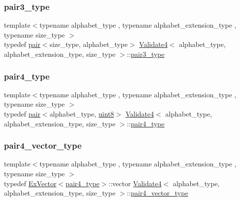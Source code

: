 \subsubsection{\texorpdfstring{pair3\+\_\+type}{pair3\_type}}
{\footnotesize\ttfamily template$<$typename alphabet\+\_\+type , typename alphabet\+\_\+extension\+\_\+type , typename size\+\_\+type $>$ \\
typedef \hyperlink{structpair}{pair}$<$size\+\_\+type, alphabet\+\_\+type$>$ \hyperlink{class_validate4}{Validate4}$<$ alphabet\+\_\+type, alphabet\+\_\+extension\+\_\+type, size\+\_\+type $>$\+::\hyperlink{class_validate4_ac023757abc671597cf81dcc2d70b1ab1}{pair3\+\_\+type}\hspace{0.3cm}{\ttfamily [private]}}

\mbox{\label{class_validate4_a8ef701022ecc2f0ffc1eae0e71e0aaf7}} 
\subsubsection{\texorpdfstring{pair4\+\_\+type}{pair4\_type}}
{\footnotesize\ttfamily template$<$typename alphabet\+\_\+type , typename alphabet\+\_\+extension\+\_\+type , typename size\+\_\+type $>$ \\
typedef \hyperlink{structpair}{pair}$<$alphabet\+\_\+type, \hyperlink{types_8h_a115946cb5fc5879545e9ccea096a6031}{uint8}$>$ \hyperlink{class_validate4}{Validate4}$<$ alphabet\+\_\+type, alphabet\+\_\+extension\+\_\+type, size\+\_\+type $>$\+::\hyperlink{class_validate4_a8ef701022ecc2f0ffc1eae0e71e0aaf7}{pair4\+\_\+type}\hspace{0.3cm}{\ttfamily [private]}}

\mbox{\label{class_validate4_a883822e6f1be0d67f71e1feb9729b1dc}} 
\subsubsection{\texorpdfstring{pair4\+\_\+vector\+\_\+type}{pair4\_vector\_type}}
{\footnotesize\ttfamily template$<$typename alphabet\+\_\+type , typename alphabet\+\_\+extension\+\_\+type , typename size\+\_\+type $>$ \\
typedef \hyperlink{struct_ex_vector}{Ex\+Vector}$<$\hyperlink{class_validate4_a8ef701022ecc2f0ffc1eae0e71e0aaf7}{pair4\+\_\+type}$>$\+::vector \hyperlink{class_validate4}{Validate4}$<$ alphabet\+\_\+type, alphabet\+\_\+extension\+\_\+type, size\+\_\+type $>$\+::\hyperlink{class_validate4_a883822e6f1be0d67f71e1feb9729b1dc}{pair4\+\_\+vector\+\_\+type}\hspace{0.3cm}{\ttfamily [private]}}


